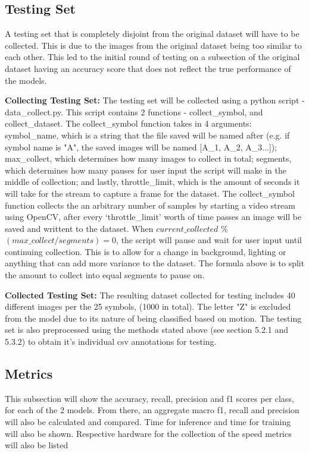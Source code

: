 \documentclass[11pt]{article}
\def\paraskip{\vskip 0.4cm}
\begin{document}
    \subsection{Testing Set}
        A testing set that is completely disjoint from the original dataset will have to be collected. This is due to the images from the original dataset being too similar to each other. This led to the initial round of testing on a subsection of the original dataset having an accuracy score that does not reflect the true performance of the models. 

        \paraskip

        \noindent\textbf{Collecting Testing Set: } The testing set will be collected using a python script - data\_collect.py. This script contains 2 functions - collect\_symbol, and collect\_dataset. The collect\_symbol function takes in 4 arguments: symbol\_name, which is a string that the file saved will be named after (e.g. if symbol name is "A", the saved images will be named [A\_1, A\_2, A\_3...]); max\_collect, which determines how many images to collect in total; segments, which determines how many pauses for user input the script will make in the middle of collection; and lastly, throttle\_limit, which is the amount of seconds it will take for the stream to capture a frame for the dataset. The collect\_symbol function collects the an arbitrary number of samples by starting a video stream using OpenCV, after every `throttle\_limit' worth of time passes an image will be saved and writtent to the dataset. When $current\_collected$ \% $ (max\_collect/segments) = 0$, the script will pause and wait for user input until continuing collection. This is to allow for a change in background, lighting or anything that can add more variance to the dataset. The formula above is to split the amount to collect into equal segments to pause on.
        
        \paraskip

        \noindent\textbf{Collected Testing Set: } The resulting dataset collected for testing includes 40 different images per the 25 symbols, (1000 in total). The letter "Z" is excluded from the model due to its nature of being classified based on motion. The testing set is also preprocessed using the methods stated above (see section 5.2.1 and 5.3.2) to obtain it's individual csv annotations for testing.

    \subsection{Metrics}
        This subsection will show the accuracy, recall, precision and f1 scores per class, for each of the 2 models. From there, an aggregate macro f1, recall and precision will also be calculated and compared. Time for inference and time for training will also be shown. Respective hardware for the collection of the speed metrics will also be listed
\end{document}
